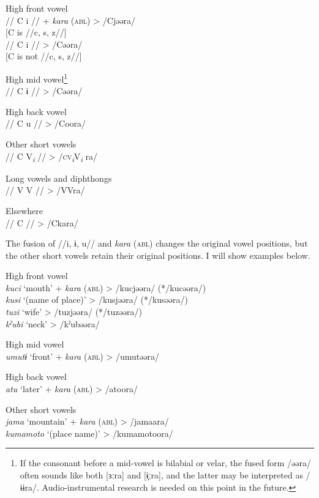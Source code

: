 \ea\label{ex:6-33} \ea High front vowel\\
    //  C  i  //  +  \textit{kara} (\textsc{abl})  >  /Cjəəra/\\{}
    [C is //c, s, z//]\\
    //  C  i  //      >  /Cəəra/\\{}
    [C is not //c, s, z//]

\ex High mid vowel\footnote{If the consonant before a mid-vowel is bilabial or velar, the fused form /əəra/ often sounds like both [ɜːra] and [ɨ̞ːra], and the latter may be interpreted as /ɨɨra/. Audio-instrumental research is needed on this point in the future.}\\
    //  C  ɨ  //      >  /Cəəra/

\ex High back vowel\\
    //  C  u  //      >  /Coora/

\ex Other short vowels\\
    //  C  V\textit{\textsubscript{i}}  //      >  /\textsc{cv}\textit{\textsubscript{i}}V\textit{\textsubscript{i} }ra/

\ex Long vowels and diphthongs\\
    //  V  V  //      >  /VVra/

\ex  Elsewhere\\
    //  C  //        >  /Ckara/
\z
\z

The fusion of //i, ɨ, u// and \textit{kara} (\textsc{abl}) changes the original vowel positions, but the other short vowels retain their original positions. I will show examples below.

\ea\label{ex:6-34}
 \ea High front vowel  \\
    \textit{kuci}  ‘mouth’  +  \textit{kara} (\textsc{abl})  >  /kucjəəra/  (*/kucəəra/)\\
    \textit{kusi}  ‘(name of place)’      >  /kusjəəra/  (*/kusəəra/)\\
    \textit{tuzi}  ‘wife’      >  /tuzjəəra/  (*/tuzəəra/)\\
    \textit{kˀubi}  ‘neck’      >  /kˀubəəra/  

\ex High mid vowel\\
    \textit{umutɨ}  ‘front’  +  \textit{kara} (\textsc{abl})  >  /umutəəra/

\ex High back vowel  \\
    \textit{atu}  ‘later’  +  \textit{kara} (\textsc{abl})  >  /atoora/

\ex Other short vowels\\
    \textit{jama}  ‘mountain’  +  \textit{kara} (\textsc{abl})  >  /jamaara/\\
    \textit{kumamoto}  ‘(place name)’      >  /kumamotoora/  

